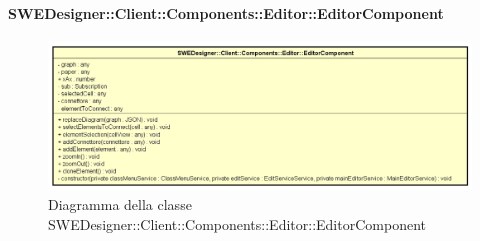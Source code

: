           	\paragraph{SWEDesigner::Client::Components::Editor::EditorComponent}
          	\begin{figure}[h!]
			\centering
			\includegraphics[scale=0.8]{Classi/SWEDesigner__Client__Components__Editor__EditorComponent.png}
			\caption{Diagramma della classe SWEDesigner::Client::Components::Editor::EditorComponent}
 			\end{figure}
